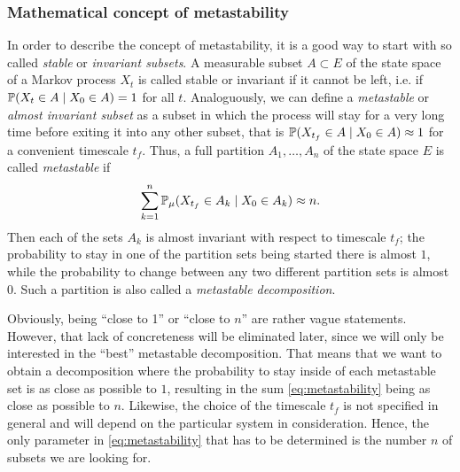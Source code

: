 \subsubsection*{Mathematical concept of metastability}

In order to describe the concept of metastability, it is a good way to start with so called \textit{stable} or \textit{invariant subsets}. A measurable subset $A \subset E$ of the state space of a Markov process $X_t$ is called stable or invariant if it cannot be left, i.e. if $\mathbb{P}(X_t \in A \mid X_0 \in A) = 1$ for all $t$.
Analoguously, we can define a \textit{metastable} or \textit{almost invariant subset} as a subset in which the process will stay for a very long time before exiting it into any other subset, that is $\mathbb{P}(X_{t_f} \in A \mid X_0 \in A) \approx 1$ for a convenient timescale $t_f$.
Thus, a full partition $A_1,\dots,A_n$ of the state space $E$ is called \textit{metastable} if
\begin{equation}
\label{eq:metastability}
\sum_{k=1}^n \mathbb{P}_\mu(X_{t_f} \in A_k \mid X_0 \in A_k) \approx n.
\end{equation}
Then each of the sets $A_k$ is almost invariant with respect to timescale $t_f$;
the probability to stay in one of the partition sets being started there is almost $1$, while the probability to change between any two different partition sets is almost $0$.
Such a partition is also called a \textit{metastable decomposition}.

Obviously, being ``close to 1'' or ``close to $n$'' are rather vague statements.
However, that lack of concreteness will be eliminated later, since we will only be interested in the ``best'' metastable decomposition.
That means that we want to obtain a decomposition where the probability to stay inside of each metastable set is as close as possible to $1$, resulting in the sum \eqref{eq:metastability} being as close as possible to $n$.
Likewise, the choice of the timescale $t_f$ is not specified in general and will depend on the particular system in consideration.
Hence, the only parameter in \eqref{eq:metastability} that has to be determined is the number $n$ of subsets we are looking for.

